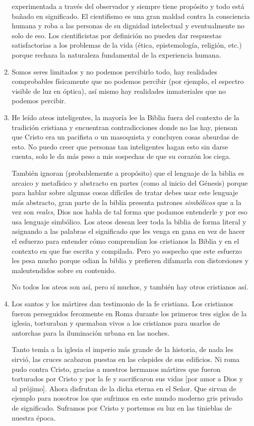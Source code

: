 \documentclass[12pt]{article}
\begin{document}
\begin{enumerate}
	experimentada a través del observador y siempre tiene propósito y todo
	está bañado en significado. El cientifismo es una gran maldad contra la
	consciencia humana y roba a las personas de su dignidad intelectual y
	eventualmente no solo de eso. Los cientificistas por definición no
	pueden dar respuestas satisfactorias a los problemas de la vida (ética,
	epistemología, religión, etc.) porque rechaza la naturaleza fundamental
	de la experiencia humana.
	\item Somos seres limitados y no podemos percibirlo todo, hay realidades
	comprobables físicamente que no podemos percibir (por ejemplo, el
	espectro visible de luz en óptica), así mismo hay realidades
	inmateriales que no podemos percibir.
	\item He leído ateos inteligentes, la mayoría lee la Biblia fuera del
	contexto de la tradición cristiana y encuentran contradicciones donde no
	las hay, piensan que Cristo era un pacifista o un masoquista y concluyen
	cosas absurdas de esto. No puedo creer que personas tan inteligentes
	hagan esto sin darse cuenta, solo le da más peso a mis sospechas de que
	su corazón los ciega.

	También ignoran (probablemente a propósito) que el lenguaje de la biblia
	es arcaico y metafísico y abstracto en partes (como al inicio del
	Génesis) porque para hablar sobre algunas cosas difíciles de tratar
	debes usar este lenguaje más abstracto, gran parte de la biblia presenta
	patrones \textit{simbólicos} que a la vez son \textit{reales}, Dios nos
	habla de tal forma que podamos entenderle y por eso usa lenguaje
	simbólico. Los ateos desean leer toda la biblia de forma literal y
	asignando a las palabras el significado que les venga en gana en vez de
	hacer el esfuerzo para entender cómo comprendían los cristianos la
	Biblia y en el contexto en que fue escrita y compilada. Pero yo sospecho
	que este esfuerzo les pesa mucho porque odian la biblia y prefieren
	difamarla con distorsiones y malentendidos sobre su contenido.

	No todos los ateos son así, pero sí muchos, y también hay otros
	cristianos así.

	\item Los santos y los mártires dan testimonio de la fe cristiana. Los
	cristianos fueron perseguidos ferozmente en Roma durante los primeros
	tres siglos de la iglesia, torturaban y quemaban vivos a los cristianos
	para usarlos de antorchas para la iluminación urbana en las noches.

	Tanto temía a la iglesia el imperio más grande de la historia, de nada
	les sirvió, las cruces acabaron puestas en las cúspides de sus
	edificios. Ni roma pudo contra Cristo, gracias a nuestros hermanos
	mártires que fueron torturados por Cristo y por la fe y sacrificaron sus
	vidas [por amor a Dios y al prójimo]. Ahora disfrutan de la dicha eterna
	en el Señor. Que sirvan de ejemplo para nosotros los que sufrimos en
	este mundo moderno gris privado de significado. Suframos por Cristo y
	portemos su luz en las tinieblas de nuestra época.


\end{enumerate}
\end{document}
